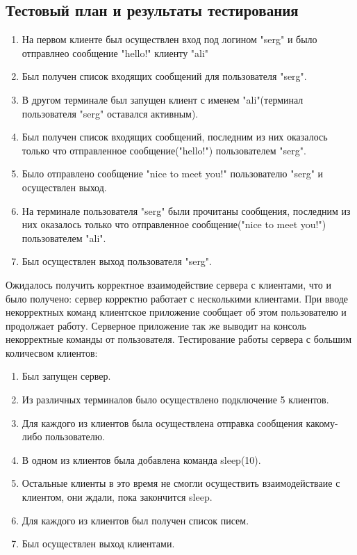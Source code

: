 \documentclass[12pt,a4paper]{report}
\begin{document}
\subsection{Тестовый план и результаты тестирования}
\begin{enumerate}
\item На первом клиенте был осуществлен вход под логином "serg" и было отправлнео сообщение "hello!" клиенту "ali"
\item Был получен список входящих сообщений для пользователя "serg".
\item В другом терминале был запущен клиент с именем "ali"(терминал пользователя "serg" оставался активным).
\item Был получен список входящих сообщений, последним из них оказалось только что отправленное сообщение("hello!") пользователем "serg".
\item Было отправлено сообщение "nice to meet you!" пользователю "serg" и осуществлен выход.
\item На терминале пользователя "serg" были прочитаны сообщения, последним из них оказалось только что отправленное сообщение("nice to meet you!") пользователем "ali".
\item Был осуществлен выход пользователя "serg".
\end{enumerate}
Ожидалось получить корректное взаимодействие сервера с клиентами, что и было получено: сервер корректно работает с несколькими клиентами.
При вводе некорректных команд клиентское приложение сообщает об этом пользователю и продолжает работу. Серверное приложение так же выводит на консоль некорректные команды от пользователя.
\linebreak
\linebreak
Тестирование работы сервера с большим количесвом клиентов:
\begin{enumerate}
\item Был запущен сервер.
\item Из различных терминалов было осуществлено подключение 5 клиентов.
\item Для каждого из клиентов была осуществлена отправка сообщения какому-либо пользователю.
\item В одном из клиентов была добавлена команда sleep(10).
\item Остальные клиенты в это время не смогли осуществить взаимодействаие с клиентом, они ждали, пока закончится sleep.
\item Для каждого из клиентов был получен список писем.
\item Был осуществлен выход клиентами.
\end{enumerate}
\end{document}
